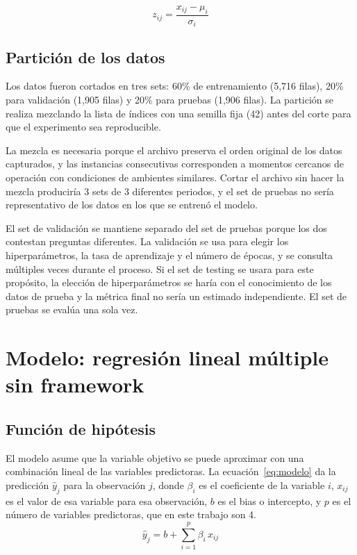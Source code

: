 \documentclass[conference]{IEEEtran}
\begin{document}
\begin{equation}
z_{ij} = \frac{x_{ij} - \mu_i}{\sigma_i}
\label{eq:estandarizacion}
\end{equation}

\subsection{Partición de los datos}
Los datos fueron cortados en tres sets: 60\% de entrenamiento (5,716 filas), 20\% para validación (1,905 filas) y 20\% para pruebas (1,906 filas). La partición se realiza mezclando la lista de índices con una semilla fija (42) antes del corte para que el experimento sea reproducible.

La mezcla es necesaria porque el archivo preserva el orden original de los datos capturados, y las instancias consecutivas corresponden a momentos cercanos de operación con condiciones de ambientes similares. Cortar el archivo sin hacer la mezcla produciría 3 sets de 3 diferentes periodos, y el set de pruebas no sería representativo de los datos en los que se entrenó el modelo. 

El set de validación se mantiene separado del set de pruebas porque los dos contestan preguntas diferentes. La validación se usa para elegir los hiperparámetros, la tasa de aprendizaje y el número de épocas, y se consulta múltiples veces durante el proceso. Si el set de testing se usara para este propósito, la elección de hiperparámetros se haría con el conocimiento de los datos de prueba y la métrica final no sería un estimado independiente. El set de pruebas se evalúa una sola vez.

\section{Modelo: regresión lineal múltiple sin framework}
\label{sec:modelo}

\subsection{Función de hipótesis}
El modelo asume que la variable objetivo se puede aproximar con una combinación lineal de las variables predictoras. La ecuación~\ref{eq:modelo} da la predicción $\hat{y}_j$ para la observación $j$, donde $\beta_i$ es el coeficiente de la variable $i$, $x_{ij}$ es el valor de esa variable para esa observación, $b$ es el bias o intercepto, y $p$ es el número de variables predictoras, que en este trabajo son 4.
\begin{equation}
\hat{y}_j = b + \sum_{i=1}^{p} \beta_i \, x_{ij}
\label{eq:modelo}
\end{equation}
\end{document}

